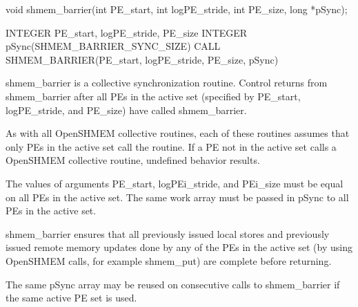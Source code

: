 
\synC
	  void shmem_barrier(int PE_start, int logPE_stride, int PE_size, long *pSync);

\synF
	  INTEGER PE_start, logPE_stride, PE_size
	  INTEGER pSync(SHMEM_BARRIER_SYNC_SIZE)
	  CALL SHMEM_BARRIER(PE_start, logPE_stride, PE_size, pSync)


{
       shmem\_barrier is a collective synchronization routine.  Control returns
       from shmem\_barrier after all  \ac{PE}s  in  the  active  set	(specified  by
       \ac{PE}\_start, log\ac{PE}\_stride, and \ac{PE}\_size) have called shmem\_barrier.

       As  with	 all OpenSHMEM collective routines, each of these routines assumes
       that only \ac{PE}s in the active set call the routine.  If a \ac{PE} not  in  the
       active  set  calls  a  OpenSHMEM  collective	 routine,  undefined  behavior
       results.

       The  values  of	arguments  \ac{PE}\_start, log\ac{PE}i\_stride, and \ac{PE}i\_size must be
       equal on all \ac{PE}s in the active set.  The same work array must be passed
       in pSync to all \ac{PE}s in the active set.

       shmem\_barrier  ensures  that  all  previously  issued  local stores and
       previously issued remote memory updates done by any of the \ac{PE}s  in  the
       active  set  (by	 using	OpenSHMEM  calls,  for  example  shmem\_put) are
       complete before returning.

       The  same  pSync	 array	may  be	 reused	 on   consecutive   calls   to
       shmem\_barrier if the same active \ac{PE} set is used.
}
